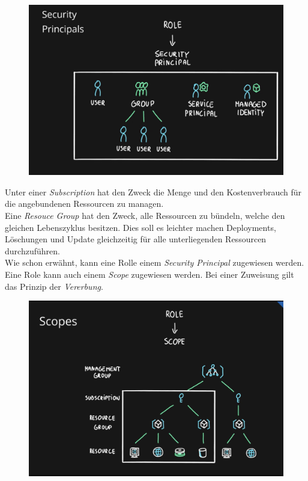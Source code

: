 \begin{figure}[H]
	\centering
	\includegraphics[scale = 0.2]{attachment/chapter_2/Scc121}
\end{figure}

Unter einer \textit{Subscription} hat den Zweck die Menge und den Kostenverbrauch für die angebundenen Ressourcen zu managen.\\

Eine \textit{Resouce Group} hat den Zweck, alle Ressourcen zu bündeln, welche den gleichen Lebenszyklus besitzen. Dies soll es leichter machen Deployments, Löschungen und Update gleichzeitig für alle unterliegenden Ressourcen durchzuführen.\\

Wie schon erwähnt, kann eine Rolle einem \textit{Security Principal} zugewiesen werden. Eine Role kann auch einem \textit{Scope} zugewiesen werden. Bei einer Zuweisung gilt das Prinzip der \textit{Vererbung}.
\begin{figure}[H]
	\centering
	\includegraphics[scale = 0.2]{attachment/chapter_2/Scc124}
\end{figure}

